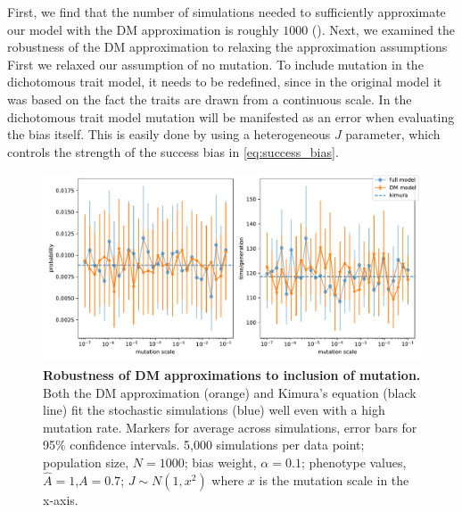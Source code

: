 \documentclass[12pt]{extarticle}
\begin{document}
First, we find that the number of simulations needed to sufficiently approximate our model with the DM approximation is roughly $1000$ ().
Next, we examined the robustness of the DM approximation to relaxing the approximation assumptions
First we relaxed our assumption of no mutation. %
To include mutation in the dichotomous trait model, it needs to be redefined, since in the original model it was based on the fact the traits are drawn from a continuous scale. In the dichotomous trait model mutation will be manifested as an error when evaluating the bias itself. This is easily done by using a heterogeneous $J$ parameter, which controls the strength of the success bias in \cref{eq:success_bias}. %

\begin{figure}
    \includegraphics[width=\linewidth]{../figures/binary/full_vs_dm_mutation.pdf}
  \caption{
  \textbf{Robustness of DM approximations to inclusion of mutation.} Both the DM approximation (orange) and Kimura's equation (black line) fit the stochastic simulations (blue) well even with a high mutation rate. Markers for average across simulations, error bars for 95\% confidence intervals.
  5,000 simulations per data point; population size, $N=1000$; bias weight, $\alpha=0.1$; phenotype values, $\hat{A}=1$,$A=0.7$; $J\sim N(1,x^2)$ where $x$ is the mutation scale in the x-axis. %
  }	
  \label{fig:hetro_mutation}
\end{figure}
\end{document}
